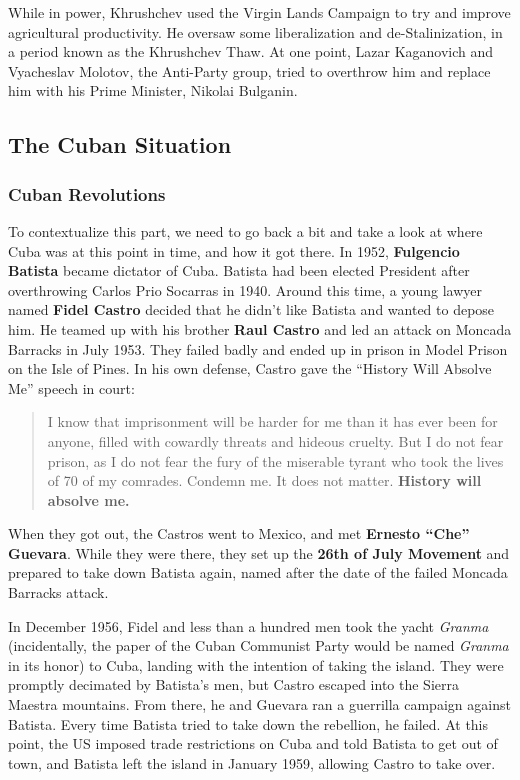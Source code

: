 While in power,
Khrushchev used the Virgin Lands Campaign to try and improve agricultural productivity.
He oversaw some liberalization and de-Stalinization, in a period known as the Khrushchev Thaw.
At one point, Lazar Kaganovich and Vyacheslav Molotov, the Anti-Party group, tried to overthrow him
and replace him with his Prime Minister, Nikolai Bulganin.

\subsection*{The Cuban Situation}

\subsubsection*{Cuban Revolutions}

To contextualize this part,
we need to go back a bit and take a look at where Cuba was at this point in time, and how it got there.
In 1952, \textbf{Fulgencio Batista} became dictator of Cuba.
Batista had been elected President after overthrowing Carlos Prio Socarras in 1940.
Around this time,
a young lawyer named \textbf{Fidel Castro}
decided that he didn't like Batista and wanted to depose him.
He teamed up with his brother \textbf{Raul Castro}
and led an attack on Moncada Barracks in July 1953.
They failed badly and ended up in prison in Model Prison on the Isle of Pines.
In his own defense, Castro gave the ``History Will Absolve Me'' speech in court:
\begin{quote}
  I know that imprisonment will be harder for me than it has ever been for anyone,
  filled with cowardly threats and hideous cruelty.
  But I do not fear prison,
  as I do not fear the fury of the miserable tyrant who took the lives of 70 of my comrades.
  Condemn me.
  It does not matter.
  \textbf{History will absolve me.}
\end{quote}

When they got out, the Castros went to Mexico, and met \textbf{Ernesto ``Che'' Guevara}.
While they were there,
they set up the \textbf{26th of July Movement} and prepared to take down Batista again,
named after the date of the failed Moncada Barracks attack.

In December 1956, Fidel and less than a hundred men took the yacht \textit{Granma}
(incidentally, the paper of the Cuban Communist Party would be named \textit{Granma} in its honor)
to Cuba, landing with the intention of taking the island.
They were promptly decimated by Batista's men, but Castro escaped into the Sierra Maestra mountains.
From there, he and Guevara ran a guerrilla campaign against Batista.
Every time Batista tried to take down the rebellion, he failed.
At this point, the US imposed trade restrictions on Cuba and told Batista to get out of town,
and Batista left the island in January 1959, allowing Castro to take over.

